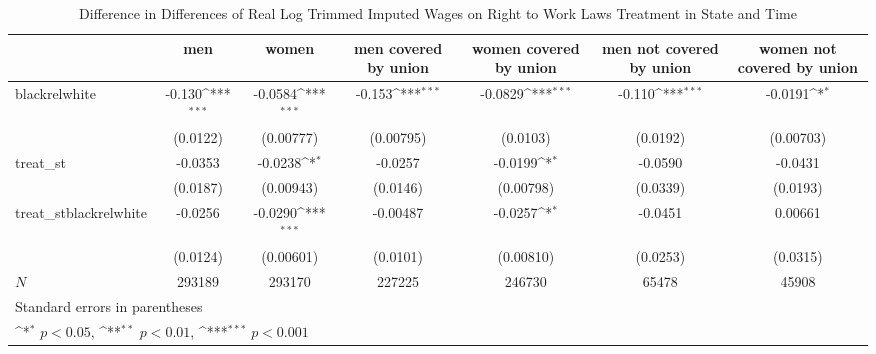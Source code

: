 \begin{table}[htbp]\centering
\def\sym#1{\ifmmode^{#1}\else\(^{#1}\)\fi}
\caption{Difference in Differences of Real Log Trimmed Imputed Wages on Right to Work Laws Treatment in State and Time}
\begin{tabular}{l*{6}{c}}
\hline\hline
            &\multicolumn{1}{c}{men}&\multicolumn{1}{c}{women}&\multicolumn{1}{c}{men covered by union}&\multicolumn{1}{c}{women covered by union}&\multicolumn{1}{c}{men not covered by union}&\multicolumn{1}{c}{women not covered by union}\\
\hline
blackrelwhite&      -0.130\sym{***}&     -0.0584\sym{***}&      -0.153\sym{***}&     -0.0829\sym{***}&      -0.110\sym{***}&     -0.0191\sym{*}  \\
            &    (0.0122)         &   (0.00777)         &   (0.00795)         &    (0.0103)         &    (0.0192)         &   (0.00703)         \\
[1em]
treat\_st    &     -0.0353         &     -0.0238\sym{*}  &     -0.0257         &     -0.0199\sym{*}  &     -0.0590         &     -0.0431         \\
            &    (0.0187)         &   (0.00943)         &    (0.0146)         &   (0.00798)         &    (0.0339)         &    (0.0193)         \\
[1em]
treat\_stblackrelwhite&     -0.0256         &     -0.0290\sym{***}&    -0.00487         &     -0.0257\sym{*}  &     -0.0451         &     0.00661         \\
            &    (0.0124)         &   (0.00601)         &    (0.0101)         &   (0.00810)         &    (0.0253)         &    (0.0315)         \\
\hline
\(N\)       &      293189         &      293170         &      227225         &      246730         &       65478         &       45908         \\
\hline\hline
\multicolumn{7}{l}{\footnotesize Standard errors in parentheses}\\
\multicolumn{7}{l}{\footnotesize \sym{*} \(p<0.05\), \sym{**} \(p<0.01\), \sym{***} \(p<0.001\)}\\
\end{tabular}
\end{table}
